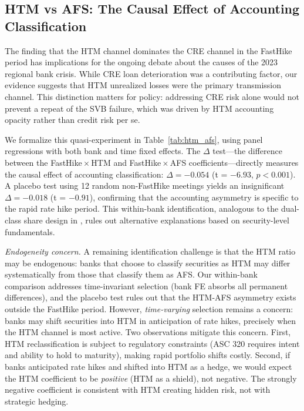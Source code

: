 \documentclass[12pt,a4paper]{article}
\begin{document}
\subsection{HTM vs AFS: The Causal Effect of Accounting Classification}

The finding that the HTM channel dominates the CRE channel in the FastHike period has implications for the ongoing debate about the causes of the 2023 regional bank crisis. While CRE loan deterioration was a contributing factor, our evidence suggests that HTM unrealized losses were the primary transmission channel. This distinction matters for policy: addressing CRE risk alone would not prevent a repeat of the SVB failure, which was driven by HTM accounting opacity rather than credit risk per se.

We formalize this quasi-experiment in Table~\ref{tab:htm_afs}, using panel regressions with both bank and time fixed effects. The $\Delta$ test---the difference between the FastHike\,$\times$\,HTM and FastHike\,$\times$\,AFS coefficients---directly measures the causal effect of accounting classification: $\Delta = -0.054$ (t = $-6.93$, $p < 0.001$). A placebo test using 12 random non-FastHike meetings yields an insignificant $\Delta = -0.018$ (t = $-0.91$), confirming that the accounting asymmetry is specific to the rapid rate hike period. This within-bank identification, analogous to the dual-class share design in \citet{LuWu2024}, rules out alternative explanations based on security-level fundamentals.

\noindent\textit{Endogeneity concern.} A remaining identification challenge is that the HTM ratio may be endogenous: banks that choose to classify securities as HTM may differ systematically from those that classify them as AFS. Our within-bank comparison addresses time-invariant selection (bank FE absorbs all permanent differences), and the placebo test rules out that the HTM-AFS asymmetry exists outside the FastHike period. However, \textit{time-varying} selection remains a concern: banks may shift securities into HTM in anticipation of rate hikes, precisely when the HTM channel is most active. Two observations mitigate this concern. First, HTM reclassification is subject to regulatory constraints (ASC 320 requires intent and ability to hold to maturity), making rapid portfolio shifts costly. Second, if banks anticipated rate hikes and shifted into HTM as a hedge, we would expect the HTM coefficient to be \textit{positive} (HTM as a shield), not negative. The strongly negative coefficient is consistent with HTM creating hidden risk, not with strategic hedging.
\end{document}
